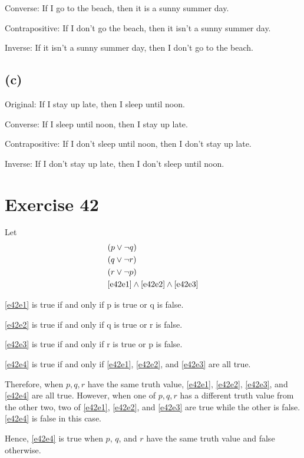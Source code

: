 \documentclass{article}
\begin{document}
Converse: If I go to the beach, then it is a sunny summer day.

Contrapositive: If I don't go the beach, then it isn't a sunny summer day.

Inverse: If it isn't a sunny summer day, then I don't go to the beach.

\subsection{(c)}
Original: If I stay up late, then I sleep until noon.

Converse: If I sleep until noon, then I stay up late.

Contrapositive: If I don't sleep until noon, then I don't stay up late.

Inverse: If I don't stay up late, then I don't sleep until noon.

\pagebreak

\section{Exercise 42}
Let
\begin{align}
	 & (p \lor \neg q) \label{e42e1}                                       \\
	 & (q \lor \neg r) \label{e42e2}                                       \\
	 & (r \lor \neg p) \label{e42e3}                                       \\
	 & \eqref{e42e1} \land \eqref{e42e2} \land \eqref{e42e3} \label{e42e4}
\end{align}

\eqref{e42e1} is true if and only if p is true or q is false.

\eqref{e42e2} is true if and only if q is true or r is false.

\eqref{e42e3} is true if and only if r is true or p is false.

\eqref{e42e4} is true if and only if \eqref{e42e1}, \eqref{e42e2}, and \eqref{e42e3} are all true.

Therefore, when $p,q,r$ have the same truth value, \eqref{e42e1}, \eqref{e42e2}, \eqref{e42e3}, and \eqref{e42e4} are all true. However, when one of $p,q,r$ has a different truth value from the other two, two of \eqref{e42e1}, \eqref{e42e2}, and \eqref{e42e3} are true while the other is false. \eqref{e42e4} is false in this case.

Hence, \eqref{e42e4} is true when $p$, $q$, and $r$ have the same truth value and false otherwise.
\end{document}
